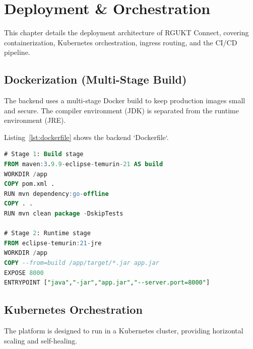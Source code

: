 \chapter{Deployment \& Orchestration}
\label{ch:deployment}

This chapter details the deployment architecture of RGUKT Connect, covering containerization, Kubernetes orchestration, ingress routing, and the CI/CD pipeline.

\section{Dockerization (Multi-Stage Build)}
The backend uses a multi-stage Docker build to keep production images small and secure. The compiler environment (JDK) is separated from the runtime environment (JRE).

Listing~\ref{lst:dockerfile} shows the backend `Dockerfile`.

\begin{lstlisting}[language=SQL, caption=Backend Multi-Stage Dockerfile, label=lst:dockerfile]
# Stage 1: Build stage
FROM maven:3.9.9-eclipse-temurin-21 AS build
WORKDIR /app
COPY pom.xml .
RUN mvn dependency:go-offline
COPY . .
RUN mvn clean package -DskipTests

# Stage 2: Runtime stage
FROM eclipse-temurin:21-jre
WORKDIR /app
COPY --from=build /app/target/*.jar app.jar
EXPOSE 8000
ENTRYPOINT ["java","-jar","app.jar","--server.port=8000"]
\end{lstlisting}

\section{Kubernetes Orchestration}
The platform is designed to run in a Kubernetes cluster, providing horizontal scaling and self-healing.

